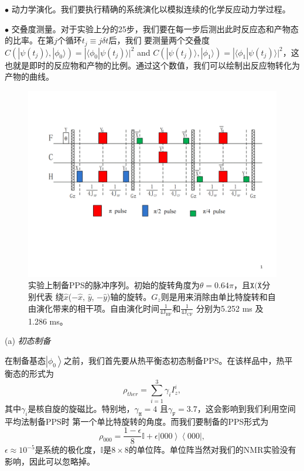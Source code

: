  $\bullet$ 动力学演化。我们要执行精确的系统演化以模拟连续的化学反应动力学过程。

 $\bullet$ 交叠度测量。对于实验上分的25步，我们要在每一步后测出此时反应态和产物态的比率。在第$j$个循环$t_j\equiv j\delta t$后，我们
 要测量两个交叠度$C(| \psi(t_j) \rangle,| \phi_{0} \rangle)=| \langle\phi_0|\psi(t_j)\rangle |^2$ and $C(| \psi(t_j) \rangle,| \phi_{1} \rangle)=
|\langle\phi_1|\psi(t_j)\rangle |^2$，这也就是即时的反应物和产物的比例。通过这个数值，我们可以绘制出反应物转化为产物的曲线。

 \begin{figure}[htbp]
            \begin{center}
              \includegraphics[width= 0.8\columnwidth]{figures/nmrdymini.pdf}
              \caption{实验上制备PPS的脉冲序列。初始的旋转角度为$\theta=0.64\pi$，且$\texttt{X}(\overline{\texttt{X}}$分别代表
              绕$\hat{x}$($-\hat{x}$, $\hat{y}$, $-\hat{y}$)轴的旋转。$G_z$则是用来消除由单比特旋转和自由演化带来的相干项。自由演化时间$\frac{1}{4\text{J}_{\text{HF}}}$和$\frac{1}{4\text{J}_{\text{CF}}}$
              分别为5.252 ms 及1.286 ms。}\label{nmrdymini}
            \end{center}
 \end{figure}

 (a) \emph{初态制备}

 在制备基态$\left\vert \phi_{0} \right\rangle$之前，我们首先要从热平衡态初态制备PPS。在该样品中，热平衡态的形式为
 \begin{equation}
\rho_{ther}=\sum\limits_{i=1}^3 \gamma_i I_z^i,
\end{equation}
其中$\gamma_i$是核自旋的旋磁比。特别地，$\gamma_\texttt{H}=4$ 且$\gamma_\texttt{F}=3.7$，这会影响到我们利用空间平均法制备PPS时
第一个单比特旋转的角度。而我们要制备的PPS形式为
\begin{equation}\label{ppsform}
\rho_{000}=\frac{1-\epsilon}{8}\mathbb{{I}}+\epsilon \left\vert 000 \right\rangle \left\langle000\right\vert,
\end{equation}
$\epsilon \approx 10^{-5}$是系统的极化度，${\mathbb{{I}}}$是$8\times8$的单位阵。单位阵当然对我们的NMR实验没有影响，因此可以忽略掉。


